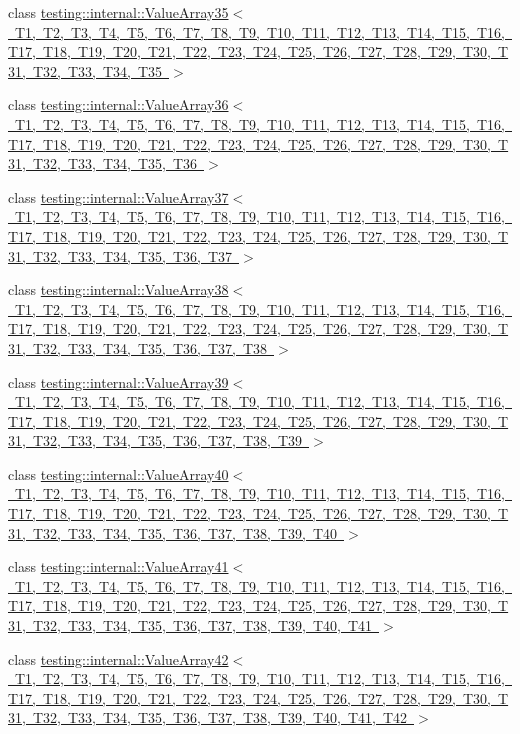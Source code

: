 \begin{DoxyCompactItemize}
\item 
class \mbox{\hyperlink{classtesting_1_1internal_1_1ValueArray35}{testing\+::internal\+::\+Value\+Array35$<$ T1, T2, T3, T4, T5, T6, T7, T8, T9, T10, T11, T12, T13, T14, T15, T16, T17, T18, T19, T20, T21, T22, T23, T24, T25, T26, T27, T28, T29, T30, T31, T32, T33, T34, T35 $>$}}
\item 
class \mbox{\hyperlink{classtesting_1_1internal_1_1ValueArray36}{testing\+::internal\+::\+Value\+Array36$<$ T1, T2, T3, T4, T5, T6, T7, T8, T9, T10, T11, T12, T13, T14, T15, T16, T17, T18, T19, T20, T21, T22, T23, T24, T25, T26, T27, T28, T29, T30, T31, T32, T33, T34, T35, T36 $>$}}
\item 
class \mbox{\hyperlink{classtesting_1_1internal_1_1ValueArray37}{testing\+::internal\+::\+Value\+Array37$<$ T1, T2, T3, T4, T5, T6, T7, T8, T9, T10, T11, T12, T13, T14, T15, T16, T17, T18, T19, T20, T21, T22, T23, T24, T25, T26, T27, T28, T29, T30, T31, T32, T33, T34, T35, T36, T37 $>$}}
\item 
class \mbox{\hyperlink{classtesting_1_1internal_1_1ValueArray38}{testing\+::internal\+::\+Value\+Array38$<$ T1, T2, T3, T4, T5, T6, T7, T8, T9, T10, T11, T12, T13, T14, T15, T16, T17, T18, T19, T20, T21, T22, T23, T24, T25, T26, T27, T28, T29, T30, T31, T32, T33, T34, T35, T36, T37, T38 $>$}}
\item 
class \mbox{\hyperlink{classtesting_1_1internal_1_1ValueArray39}{testing\+::internal\+::\+Value\+Array39$<$ T1, T2, T3, T4, T5, T6, T7, T8, T9, T10, T11, T12, T13, T14, T15, T16, T17, T18, T19, T20, T21, T22, T23, T24, T25, T26, T27, T28, T29, T30, T31, T32, T33, T34, T35, T36, T37, T38, T39 $>$}}
\item 
class \mbox{\hyperlink{classtesting_1_1internal_1_1ValueArray40}{testing\+::internal\+::\+Value\+Array40$<$ T1, T2, T3, T4, T5, T6, T7, T8, T9, T10, T11, T12, T13, T14, T15, T16, T17, T18, T19, T20, T21, T22, T23, T24, T25, T26, T27, T28, T29, T30, T31, T32, T33, T34, T35, T36, T37, T38, T39, T40 $>$}}
\item 
class \mbox{\hyperlink{classtesting_1_1internal_1_1ValueArray41}{testing\+::internal\+::\+Value\+Array41$<$ T1, T2, T3, T4, T5, T6, T7, T8, T9, T10, T11, T12, T13, T14, T15, T16, T17, T18, T19, T20, T21, T22, T23, T24, T25, T26, T27, T28, T29, T30, T31, T32, T33, T34, T35, T36, T37, T38, T39, T40, T41 $>$}}
\item 
class \mbox{\hyperlink{classtesting_1_1internal_1_1ValueArray42}{testing\+::internal\+::\+Value\+Array42$<$ T1, T2, T3, T4, T5, T6, T7, T8, T9, T10, T11, T12, T13, T14, T15, T16, T17, T18, T19, T20, T21, T22, T23, T24, T25, T26, T27, T28, T29, T30, T31, T32, T33, T34, T35, T36, T37, T38, T39, T40, T41, T42 $>$}}

\end{DoxyCompactItemize}
